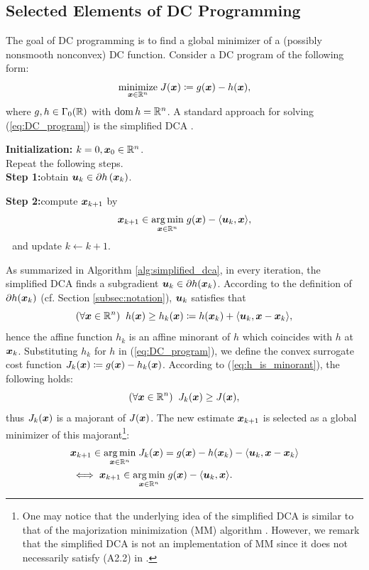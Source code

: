 \documentclass[lettersize,journal]{IEEEtran}
\theoremstyle{plain}%
\theoremstyle{definition}
\theoremstyle{remark}
\begin{document}
\subsection{Selected Elements of DC Programming}\label{subsec:selected_elements_of_DC_programming}
The goal of DC programming \cite{le2018} is to find a global minimizer of a (possibly nonsmooth nonconvex) DC function. Consider a DC program of the following form:
\begin{equation}\label{eq:DC_program}
\underset{\bm{x}\in\mathbb{R}^n}{\mathrm{minimize}}\; J(\bm{x})\coloneqq g(\bm{x})-h(\bm{x}),
\end{equation}
where $g,h\in\Gamma_0(\mathbb{R})$ with $\textrm{dom\,}{h}=\mathbb{R}^n$. A standard approach for solving (\ref{eq:DC_program}) is the simplified DCA \cite{pham1997}.

\begin{algorithm}
\textbf{Initialization:} $k=0, \bm{x}_0\in\mathbb{R}^n$.\\
Repeat the following steps.\\
\textbf{Step 1:}\quad obtain $\bm{u}_k\in\partial h\left( \bm{x}_k \right )$.

\textbf{Step 2:}\quad  compute $\bm{x}_{k+1}$ by
\[\bm{x}_{k+1}\in\underset{\bm{x}\in\mathbb{R}^n}{\mathrm{arg\,min}}\; g(\bm{x})-\langle \bm{u}_{k}, \bm{x} \rangle,\]
\quad\quad\quad$\,\,$ and update $k\leftarrow k+1$.

\caption{The simplified DCA for solving (\ref{eq:DC_program})}\label{alg:simplified_dca}
\end{algorithm}

As summarized in Algorithm \ref{alg:simplified_dca}, in every iteration, the simplified DCA finds a subgradient $\bm{u}_k\in\partial h(\bm{x}_k)$. According to the definition of $\partial h(\bm{x}_k)$ (cf. Section \ref{subsec:notation}), $\bm{u}_k$ satisfies that
\begin{equation}\label{eq:h_is_minorant}
(\forall \bm{x}\in\mathbb{R}^n)\;\; h(\bm{x})\geq h_k(\bm{x})\coloneqq h(\bm{x}_k)+\langle \bm{u}_k, \bm{x}-\bm{x}_k \rangle,
\end{equation}
hence the affine function $h_k$ is an affine minorant of $h$ which coincides with $h$ at $\bm{x}_k$.
Substituting $h_k$ for $h$ in (\ref{eq:DC_program}), we define the convex surrogate cost function $J_k(\bm{x})\coloneqq g(\bm{x})-h_k(\bm{x})$. According to (\ref{eq:h_is_minorant}), the following holds:
\begin{equation*}
(\forall\bm{x}\in\mathbb{R}^n)\;\; J_k(\bm{x})\geq J(\bm{x}),
\end{equation*}
thus $J_k(\bm{x})$ is a majorant of $J(\bm{x})$. The new estimate $\bm{x}_{k+1}$ is selected as a global minimizer of this majorant\footnote{One may notice that the underlying idea of the simplified DCA is similar to that of the majorization minimization (MM) algorithm \cite{sun2017}. However, we remark that the simplified DCA is not an implementation of MM since it does not necessarily satisfy (A2.2) in \cite{sun2017}.}:
\begin{align*}
&\bm{x}_{k+1} \in \underset{\bm{x}\in\mathbb{R}^n}{\mathrm{arg\,min}}\; J_k(\bm{x})= g(\bm{x})-h(\bm{x}_k)-\langle \bm{u}_{k}, \bm{x}-\bm{x}_k \rangle\\
&\iff\bm{x}_{k+1}\in \underset{\bm{x}\in\mathbb{R}^n}{\mathrm{arg\,min}}\; g(\bm{x})-\langle \bm{u}_{k}, \bm{x} \rangle.
\end{align*}
\end{document}
